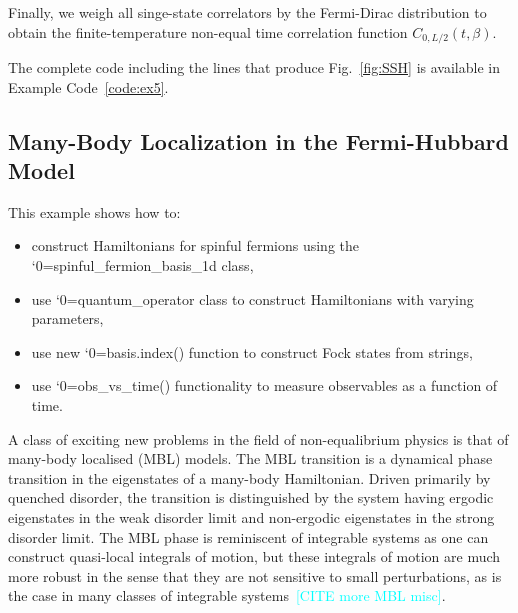 \documentclass{SciPost}
\newcommand\0{\scalebox{-1}[1]{0}}
\let\svttfamily\ttfamily
\renewcommand\ttfamily{\svttfamily\catcode`0=\active }
\renewcommand\texttt{\bgroup\ttfamily\texttthelp}
\def\texttthelp#1{#1\egroup}
\newcommand*{\cyan}{\textcolor{cyan}}
\newcommand{\SSHcode}{example5.py}
\begin{document}

Finally, we weigh all singe-state correlators by the Fermi-Dirac distribution to obtain the finite-temperature non-equal time correlation function $C_{0,L/2}(t,\beta)$.


The complete code including the lines that produce Fig.~\ref{fig:SSH} is available in Example Code~\ref{code:ex5}.







\subsection{Many-Body Localization in the Fermi-Hubbard Model}
\label{subsec:Fermion_MBL}

This example shows how to:
\begin{itemize}
	\item construct Hamiltonians for spinful fermions using the \texttt{spinful\_fermion\_basis\_1d} class,
	\item use \texttt{quantum\_operator} class to construct Hamiltonians with varying parameters,
	\item use new \texttt{basis.index()} function to construct Fock states from strings,
	\item use \texttt{obs\_vs\_time()} functionality to measure observables as a function of time.
\end{itemize}

A class of exciting new problems in the field of non-equalibrium physics is that of many-body localised (MBL) models. The MBL transition is a dynamical phase transition in the eigenstates of a many-body Hamiltonian. Driven primarily by quenched disorder, the transition is distinguished by the system having ergodic eigenstates in the weak disorder limit and non-ergodic eigenstates in the strong disorder limit. The MBL phase is reminiscent of integrable systems as one can construct quasi-local integrals of motion, but these integrals of motion are much more robust in the sense that they are not sensitive to small perturbations, as is the case in many classes of integrable systems~\cite{nandkishore_15,abanin_17}\cyan{[CITE more MBL misc]}.
\end{document}
